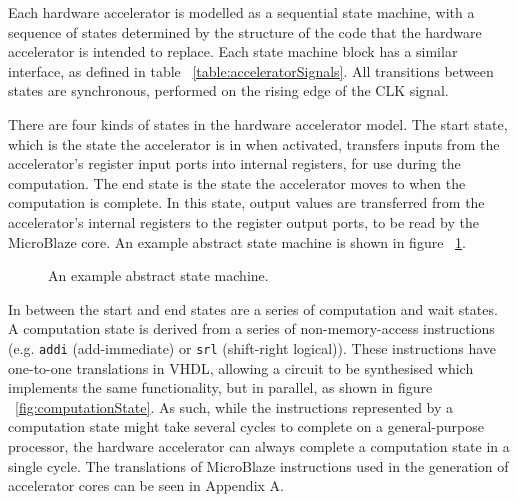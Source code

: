 \documentclass{UoYCSproject}
\begin{document}
Each hardware accelerator is modelled as a sequential state machine, with a sequence of states determined by the structure
of the code that the hardware accelerator is intended to replace. Each state machine block has a similar interface, as defined in
table ~\ref{table:acceleratorSignals}. All transitions between states are synchronous, performed on the rising edge of the CLK
signal.

There are four kinds of states in the hardware accelerator model. The start state, which is the state the accelerator is in
when activated, transfers inputs from the accelerator's register input ports into internal registers, for use during the
computation. The end state is the state the accelerator moves to when the computation is complete. In this state, output values
are transferred from the accelerator's internal registers to the register output ports, to be read by the MicroBlaze core.
An example abstract state machine is shown in figure ~\ref{fig:abstractStateMachine}.

\begin{figure}[H]
\centering
{}
\caption{An example abstract state machine.}
\label{fig:abstractStateMachine}
\end{figure}

In between the start and end states are a series of computation and wait states. A computation state is derived from a series of
non-memory-access instructions (e.g. \texttt{addi} (add-immediate) or \texttt{srl} (shift-right logical)).
These instructions have one-to-one translations in VHDL, allowing a circuit to be synthesised which implements the same
functionality, but in parallel, as shown in figure ~\ref{fig:computationState}. As such, while the instructions represented by a
computation state might take several cycles to complete on a general-purpose processor, the hardware accelerator can always
complete a computation state in a single cycle. The translations of MicroBlaze instructions used in the generation of
accelerator cores can be seen in Appendix A.
\end{document}
